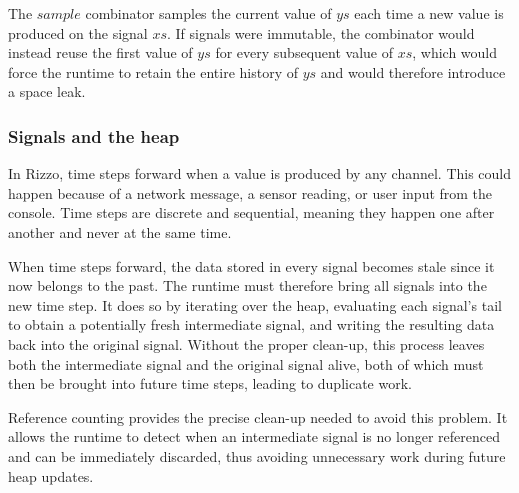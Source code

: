 The $sample$ combinator samples the current value of $ys$ each time a new value is produced on the signal $xs$. 
If signals were immutable, the combinator would instead reuse the first value of $ys$ for every subsequent value of $xs$, which would force the runtime to retain the entire history of $ys$ and would therefore introduce a space leak.

\subsubsection{Signals and the heap}\label{section:frp:signal_heap}


In Rizzo, time steps forward when a value is produced by any channel. This could happen because of a network message, a sensor reading, or user input from the console. 
Time steps are discrete and sequential, meaning they happen one after another and never at the same time. 

When time steps forward, the data stored in every signal becomes stale since it now belongs to the past. The runtime must therefore bring all signals into the new time step. It does so by iterating over the heap, evaluating each signal's tail to obtain a potentially fresh intermediate signal, and writing the resulting data back into the original signal.
Without the proper clean-up, this process leaves both the intermediate signal and the original signal alive, both of which must then be brought into future time steps, leading to duplicate work.

Reference counting provides the precise clean-up needed to avoid this problem. It allows the runtime to detect when an intermediate signal is no longer referenced and can be immediately discarded, thus avoiding unnecessary work during future heap updates.
